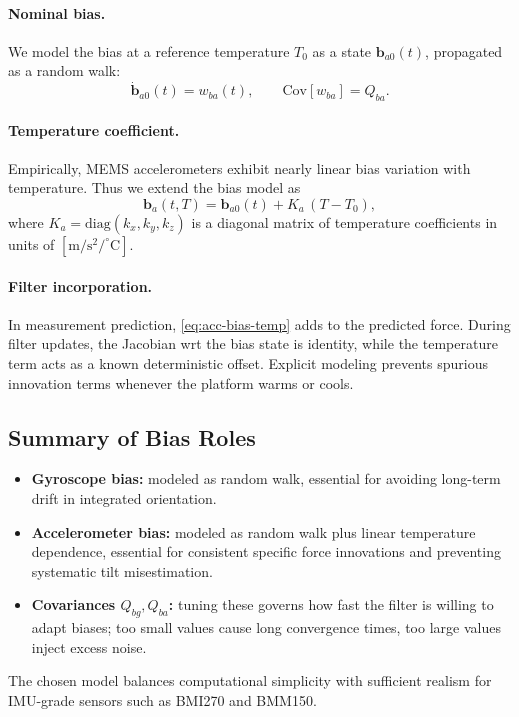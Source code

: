 \documentclass[11pt]{article}
\begin{document}
\paragraph{Nominal bias.}
We model the bias at a reference temperature $T_0$ as a state $\bm b_{a0}(t)$,
propagated as a random walk:
\begin{equation}
\dot{\bm b}_{a0}(t) = w_{ba}(t),\qquad
\mathrm{Cov}[w_{ba}] = Q_{ba}.
\label{eq:acc-bias-base}
\end{equation}

\paragraph{Temperature coefficient.}
Empirically, MEMS accelerometers exhibit nearly linear bias variation with temperature.
Thus we extend the bias model as
\begin{equation}
\bm b_a(t,T) = \bm b_{a0}(t) + K_a\,(T-T_0),
\label{eq:acc-bias-temp}
\end{equation}
where $K_a=\mathrm{diag}(k_x,k_y,k_z)$ is a diagonal matrix of temperature coefficients
in units of $[\mathrm{m/s^2}/^\circ\mathrm{C}]$.

\paragraph{Filter incorporation.}
In measurement prediction, \eqref{eq:acc-bias-temp} adds to the predicted force. During
filter updates, the Jacobian wrt the bias state is identity, while the temperature term
acts as a known deterministic offset. Explicit modeling prevents spurious innovation
terms whenever the platform warms or cools.

\subsection{Summary of Bias Roles}
\begin{itemize}
\item \textbf{Gyroscope bias:} modeled as random walk, essential for avoiding long-term
drift in integrated orientation.
\item \textbf{Accelerometer bias:} modeled as random walk plus linear temperature
dependence, essential for consistent specific force innovations and preventing systematic
tilt misestimation.
\item \textbf{Covariances $Q_{bg},Q_{ba}$:} tuning these governs how fast the filter
is willing to adapt biases; too small values cause long convergence times, too large values
inject excess noise.
\end{itemize}
The chosen model balances computational simplicity with sufficient realism for IMU-grade
sensors such as BMI270 and BMM150.
\end{document}
